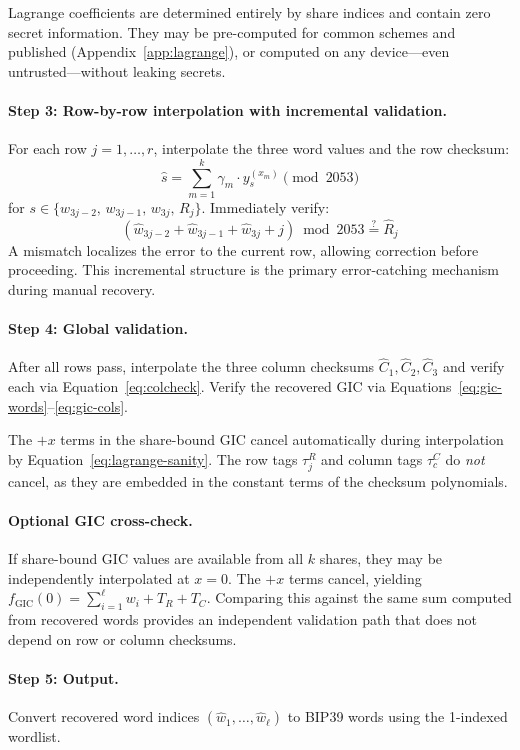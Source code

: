 \documentclass[11pt]{article}
\begin{document}
Lagrange coefficients are determined entirely by share indices and contain zero secret information. They may be pre-computed for common schemes and published (Appendix~\ref{app:lagrange}), or computed on any device---even untrusted---without leaking secrets.

\paragraph{Step 3: Row-by-row interpolation with incremental validation.} For each row $j = 1, \ldots, r$, interpolate the three word values and the row checksum:
\[
    \hat{s} = \sum_{m=1}^{k} \gamma_m \cdot y_s^{(x_m)} \pmod{2053}
\]
for $s \in \{w_{3j-2},\, w_{3j-1},\, w_{3j},\, R_j\}$. Immediately verify:
\[
    (\hat{w}_{3j-2} + \hat{w}_{3j-1} + \hat{w}_{3j} + j) \bmod 2053 \stackrel{?}{=} \hat{R}_j
\]
A mismatch localizes the error to the current row, allowing correction before proceeding. This incremental structure is the primary error-catching mechanism during manual recovery.

\paragraph{Step 4: Global validation.} After all rows pass, interpolate the three column checksums $\hat{C}_1, \hat{C}_2, \hat{C}_3$ and verify each via Equation~\eqref{eq:colcheck}. Verify the recovered GIC via Equations~\eqref{eq:gic-words}--\eqref{eq:gic-cols}.

The $+x$ terms in the share-bound GIC cancel automatically during interpolation by Equation~\eqref{eq:lagrange-sanity}. The row tags $\tau^R_j$ and column tags $\tau^C_c$ do \emph{not} cancel, as they are embedded in the constant terms of the checksum polynomials.

\paragraph{Optional GIC cross-check.} If share-bound GIC values are available from all $k$ shares, they may be independently interpolated at $x = 0$. The $+x$ terms cancel, yielding $f_{\text{GIC}}(0) = \sum_{i=1}^{\ell} w_i + T_R + T_C$. Comparing this against the same sum computed from recovered words provides an independent validation path that does not depend on row or column checksums.

\paragraph{Step 5: Output.} Convert recovered word indices $(\hat{w}_1, \ldots, \hat{w}_\ell)$ to BIP39 words using the 1-indexed wordlist.
\end{document}
